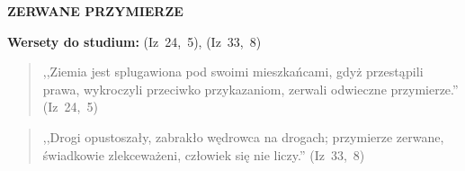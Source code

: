 \documentclass[10pt,a4paper,oneside]{article}
\begin{document}
\centerline{\textbf{\MakeUppercase{Zerwane przymierze}}}
\begin{center}
\textbf{Wersety do studium:} (Iz~24,~5), (Iz~33,~8)
\end{center}
\begin{quote}
,,Ziemia jest splugawiona pod swoimi mieszkańcami, gdyż przestąpili prawa, wykroczyli przeciwko przykazaniom, zerwali odwieczne przymierze.'' (Iz~24,~5)
\end{quote}
\begin{quote}
,,Drogi opustoszały, zabrakło wędrowca na drogach; przymierze zerwane, świadkowie zlekceważeni, człowiek się nie liczy.'' (Iz~33,~8)
\end{quote}
\end{document}
